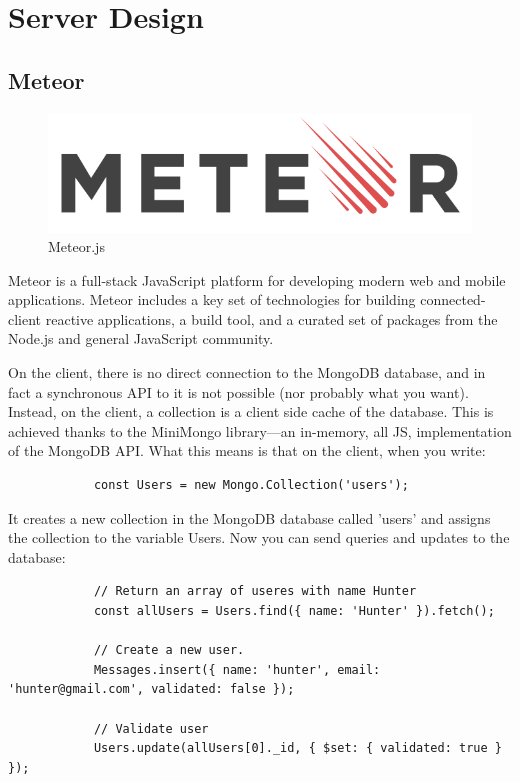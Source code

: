 \documentclass[12pt,a4paper]{report}
\begin{document}
\newpage
\section {Server Design}
	\subsection{Meteor}
		\begin{figure}[H]
			\centering
			\includegraphics[scale=.4]{meteorJS}
			\caption{Meteor.js}
			\label{fig: Meteor.js}

		\end{figure}
		Meteor is a full-stack JavaScript platform for developing modern web and mobile applications. Meteor includes a key set of technologies for building connected-client reactive applications, a build tool, and a curated set of packages from the Node.js and general JavaScript community. \cite{meteor}
		
		On the client, there is no direct connection to the MongoDB database, and in fact a synchronous API to it is not possible (nor probably what you want). Instead, on the client, a collection is a client side cache of the database. This is achieved thanks to the MiniMongo library—an in-memory, all JS, implementation of the MongoDB API. What this means is that on the client, when you write:
		
		\begin{lstlisting}
			const Users = new Mongo.Collection('users');
		\end{lstlisting}
		
		It creates a new collection in the MongoDB database called 'users' and assigns the collection to the variable Users. Now you can send queries and updates to the database:
		
		\begin{lstlisting}
			// Return an array of useres with name Hunter
			const allUsers = Users.find({ name: 'Hunter' }).fetch();
			
			// Create a new user.
			Messages.insert({ name: 'hunter', email: 'hunter@gmail.com', validated: false });
			
			// Validate user
			Users.update(allUsers[0]._id, { $set: { validated: true } });
		\end{lstlisting}
		
\end{document}
